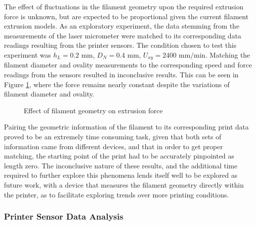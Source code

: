 \documentclass[main.tex]{subfiles}
\begin{document}
The effect of fluctuations in the filament geometry upon the required extrusion force is unknown, but are expected to be proportional given the current filament extrusion models. As an exploratory experiment, the data stemming from the measurements of the laser micrometer were matched to its corresponding data readings resulting from the printer sensors. The condition chosen to test this experiment was $h_{L} = 0.2 \text{ mm}$, $D_{N} = 0.4 \text{ mm}$, $U_{xy} = 2400 \text{ mm/min}$. Matching the filament diameter and ovality measurements to the corresponding speed and force readings from the sensors resulted in inconclusive results. This can be seen in Figure \ref{fig:f_O_D}, where the force remains nearly constant despite the variations of filament diameter and ovality. 

\begin{figure}[!htbp]
	\center
	\linebreak
	\caption{Effect of filament geometry on extrusion force} \label{fig:f_O_D}
\end{figure}

Pairing the geometric information of the filament to its corresponding print data proved to be an extremely time consuming task, given that both sets of information came from different devices, and that in order to get proper matching, the starting point of the print had to be accurately pinpointed as length zero. The inconclusive nature of  these results, and the additional time required to further explore this phenomena lends itself well to be explored as future work, with a device that measures the filament geometry directly within the printer, as to facilitate exploring trends over more printing conditions. 

\subsubsection{Printer Sensor Data Analysis}
\end{document}
